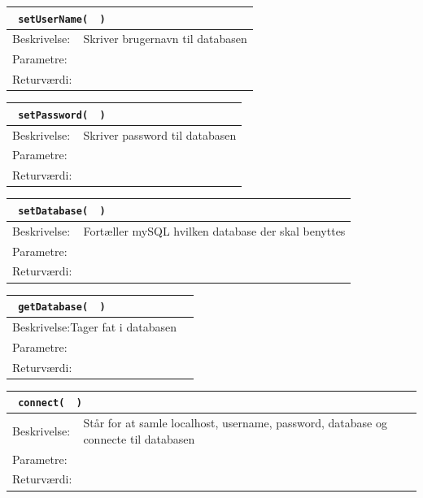 \begin{table}[H]
\begin{tabular}{l p{12.5cm}}
\multicolumn{2}{l}{\texttt{\textcolor{blue}{} setUserName( \textcolor{blue}{} )}} \\
\hline
Beskrivelse:&Skriver brugernavn til databasen\\
Parametre:&\\
Returværdi:&\\
\end{tabular}
\end{table}

\begin{table}[H]
\begin{tabular}{l p{12.5cm}}
\multicolumn{2}{l}{\texttt{\textcolor{blue}{} setPassword( \textcolor{blue}{} )}} \\
\hline
Beskrivelse:&Skriver password til databasen\\
Parametre:&\\
Returværdi:&\\
\end{tabular}
\end{table}

\begin{table}[H]
\begin{tabular}{l p{12.5cm}}
\multicolumn{2}{l}{\texttt{\textcolor{blue}{} setDatabase( \textcolor{blue}{} )}} \\
\hline
Beskrivelse:&Fortæller mySQL hvilken database der skal benyttes\\
Parametre:&\\
Returværdi:&\\
\end{tabular}
\end{table}

\begin{table}[H]
\begin{tabular}{l p{12.5cm}}
\multicolumn{2}{l}{\texttt{\textcolor{blue}{} getDatabase( \textcolor{blue}{} )}} \\
\hline
Beskrivelse:Tager fat i databasen\\
Parametre:&\\
Returværdi:&\\
\end{tabular}
\end{table}

\begin{table}[H]
\begin{tabular}{l p{12.5cm}}
\multicolumn{2}{l}{\texttt{\textcolor{blue}{} connect( \textcolor{blue}{} )}} \\
\hline
Beskrivelse:&Står for at samle localhost, username, password, database og connecte til databasen\\
Parametre:&\\
Returværdi:&\\
\end{tabular}
\end{table}

